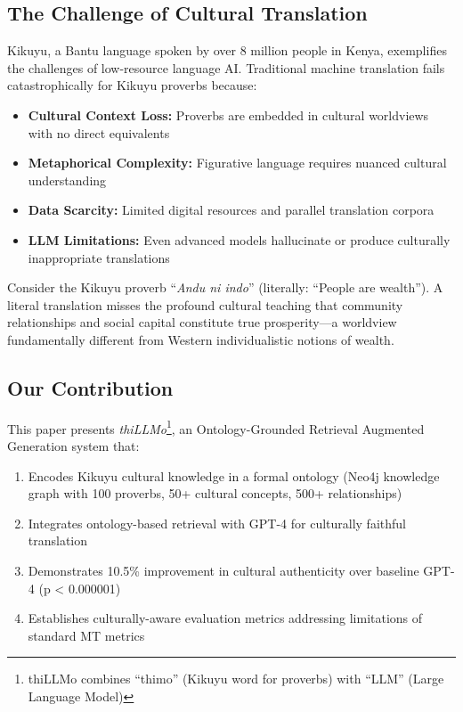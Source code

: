 \documentclass[11pt,twocolumn]{article}
\begin{document}
\subsection{The Challenge of Cultural Translation}

Kikuyu, a Bantu language spoken by over 8 million people in Kenya, exemplifies the challenges of low-resource language AI. Traditional machine translation fails catastrophically for Kikuyu proverbs because:

\begin{itemize}
    \item \textbf{Cultural Context Loss:} Proverbs are embedded in cultural worldviews with no direct equivalents
    \item \textbf{Metaphorical Complexity:} Figurative language requires nuanced cultural understanding
    \item \textbf{Data Scarcity:} Limited digital resources and parallel translation corpora
    \item \textbf{LLM Limitations:} Even advanced models hallucinate or produce culturally inappropriate translations
\end{itemize}

Consider the Kikuyu proverb ``\textit{Andu ni indo}'' (literally: ``People are wealth''). A literal translation misses the profound cultural teaching that community relationships and social capital constitute true prosperity---a worldview fundamentally different from Western individualistic notions of wealth.

\subsection{Our Contribution}

This paper presents \textit{thiLLMo}\footnote{thiLLMo combines ``thimo'' (Kikuyu word for proverbs) with ``LLM'' (Large Language Model)}, an Ontology-Grounded Retrieval Augmented Generation system that:

\begin{enumerate}
    \item Encodes Kikuyu cultural knowledge in a formal ontology (Neo4j knowledge graph with 100 proverbs, 50+ cultural concepts, 500+ relationships)
    \item Integrates ontology-based retrieval with GPT-4 for culturally faithful translation
    \item Demonstrates 10.5\% improvement in cultural authenticity over baseline GPT-4 (p < 0.000001)
    \item Establishes culturally-aware evaluation metrics addressing limitations of standard MT metrics
\end{enumerate}
\end{document}
